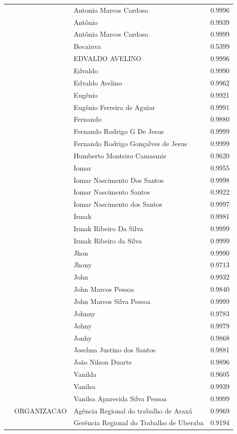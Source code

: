 \begin{table}
\begin{tabular}{llp{6cm}r}
 &  & Antonio Marcos Cardoso & 0.9996 \\
 &  & Antônio & 0.9939 \\
 &  & Antônio Marcos Cardoso & 0.9999 \\
 &  & Bocaiuva & 0.5399 \\
 &  & EDVALDO AVELINO & 0.9996 \\
 &  & Edvaldo & 0.9990 \\
 &  & Edvaldo Avelino & 0.9962 \\
 &  & Eugênio & 0.9921 \\
 &  & Eugênio Ferreira de Aguiar & 0.9991 \\
 &  & Fernando & 0.9880 \\
 &  & Fernando Rodrigo G De Jesus & 0.9999 \\
 &  & Fernando Rodrigo Gonçalves de Jesus & 0.9999 \\
 &  & Humberto Monteiro Camasmie & 0.9620 \\
 &  & Iomar & 0.9955 \\
 &  & Iomar Nascimento Dos Santos & 0.9998 \\
 &  & Iomar Nascimento Santos & 0.9922 \\
 &  & Iomar Nascimento dos Santos & 0.9997 \\
 &  & Irmak & 0.9981 \\
 &  & Irmak Ribeiro Da Silva & 0.9999 \\
 &  & Irmak Ribeiro da Silva & 0.9999 \\
 &  & Jhon & 0.9990 \\
 &  & Jhony & 0.9713 \\
 &  & John & 0.9932 \\
 &  & John Marcos Pessoa & 0.9840 \\
 &  & John Marcos Silva Pessoa & 0.9999 \\
 &  & Johnny & 0.9783 \\
 &  & Johny & 0.9979 \\
 &  & Jonhy & 0.9868 \\
 &  & Joselma Justino dos Santos & 0.9881 \\
 &  & João Nilson Duarte & 0.9896 \\
 &  & Vanilda & 0.9605 \\
 &  & Vanilsa & 0.9939 \\
 &  & Vanilsa Aparecida Silva Pessoa & 0.9999 \\
 & ORGANIZACAO & Agência Regional do trabalho de Araxá & 0.9969 \\
 &  & Gerência Regional do Trabalho de Uberaba & 0.9194 \\

\end{tabular}
\end{table}

